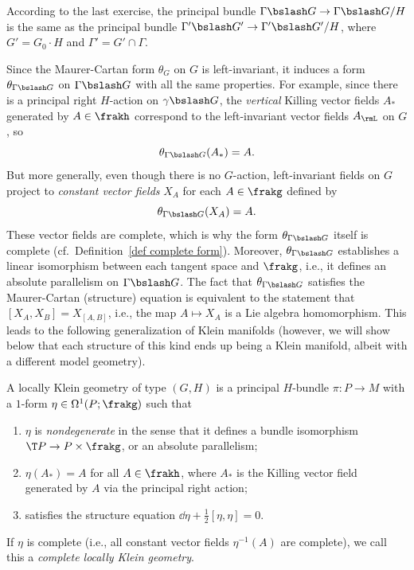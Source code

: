 According to the last exercise, the principal bundle $\Gamma\bslash G\to \Gamma\bslash G\slash H$ is the same as the principal bundle $\Gamma'\bslash G'\to \Gamma'\bslash G'\slash H$, where $G'=G_0\cdot H$ and $\Gamma'=G'\cap\Gamma$.

Since the Maurer-Cartan form $\theta_G$ on $G$ is left-invariant, it induces a form $\theta_{\Gamma\bslash G}$ on $\Gamma\bslash G$ with all the same properties. For example, since there is a principal right $H$-action on $\gamma\bslash G$, the \emph{vertical} Killing vector fields $A_\ast$ generated by $A\in\frakh$ correspond to the left-invariant vector fields $A_\rmL$ on $G$, so 
\[\theta_{\Gamma\bslash G}(A_\ast)=A.\]
But more generally, even though there is no $G$-action, left-invariant fields on $G$ project to \emph{constant vector fields} $X_A$ for each $A\in \frakg$ defined by 
\[\theta_{\Gamma\bslash G}(X_A)=A.\]
These vector fields are complete, which is why the form $\theta_{\Gamma\bslash G}$ itself is complete (cf.\ Definition~\ref{def complete form}). Moreover, $\theta_{\Gamma\bslash G}$ establishes a linear isomorphism between each tangent space and $\frakg$, i.e., it defines an absolute parallelism on $\Gamma\bslash G$.  The fact that $\theta_{\Gamma\bslash G}$ satisfies the Maurer-Cartan (structure) equation is equivalent to the statement that $[X_A,X_B]=X_{[A,B]}$, i.e., the map $A\mapsto X_A$ is a Lie algebra homomorphism. This leads to the following generalization of Klein manifolds (however, we will show below that each structure of this kind ends up being a Klein manifold, albeit with a different model geometry).


\begin{defn}
    A locally Klein geometry of type $(G,H)$ is a principal $H$-bundle $\pi:P\to M$ with a $1$-form $\eta\in \Omega^1(P;\frakg)$ such that 
    \begin{enumerate}
        \item $\eta$ is \emph{nondegenerate} in the sense that it defines a bundle isomorphism $\T P\to P\times \frakg$, or an absolute parallelism;
        \item $\eta(A_\ast)=A$ for all $A\in\frakh$, where $A_\ast$ is the Killing vector field generated by $A$ via the principal right action;
        \item satisfies the structure equation $\dd\eta+\frac12[\eta,\eta]=0$.
    \end{enumerate}
    If $\eta$ is complete (i.e., all constant vector fields $\eta^{-1}(A)$ are complete), we call this a \emph{complete locally Klein geometry}.
\end{defn}

